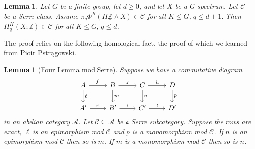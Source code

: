 \documentclass[11pt]{amsart}
\newtheorem{lemma}[equation]{Lemma}
\theoremstyle{definition}
\numberwithin{equation}{subsection} %
\def\coker{\operatorname{coker}}
\def\mfz{\underline{\mathbb{Z}}}
\def\Sp{\operatorname{Sp}}
\newcommand{\sm}{\wedge}
\newcommand{\Z}{\mathbb{Z}}
\begin{document}

\begin{lemma}\label{Lemma:Bredon-to-PhiG}
Let $G$ be a finite group, let $d\geq 0$, and let $X$ be a $G$-spectrum. Let
$\mathcal{C}$ be a Serre class. Assume $\pi_q \Phi^K(H\underline{\Z}\sm X)\in
\mathcal{C}$ for all $K\leq G$, $q\leq d+1$. Then $H_q^K(X;\underline{\Z})\in
\mathcal{C}$ for all $K\leq G$, $q\leq d$.
\end{lemma}

The proof relies on the following homological fact, the proof of which we learned from Piotr Pstr{\k{a}}gowski. 

\begin{lemma}[Four Lemma mod Serre]\label{Lem:FourModC}
Suppose we have a commutative diagram
\[
\begin{tikzcd}
A \arrow{r}{f} \arrow{d}{\ell} & B \arrow{r}{g} \arrow{d}{m} & C \arrow{r}{h} \arrow{d}{n} & D \arrow{d}{p} \\
A' \arrow{r}{r} & B' \arrow{r}{s} & C' \arrow{r}{t} & D'
\end{tikzcd}
\]
in an abelian category $\mathcal{A}$. Let $\mathcal{C} \subseteq \mathcal{A}$ be a Serre subcategory. Suppose the rows are exact, $\ell$ is an epimorphism mod $\mathcal{C}$ and $p$ is a monomorphism mod $\mathcal{C}$. If $n$ is an epimorphism mod $\mathcal{C}$ then so is $m$. If $m$ is a monomorphism mod $\mathcal{C}$ then so is $n$.
\end{lemma}
\end{document}
